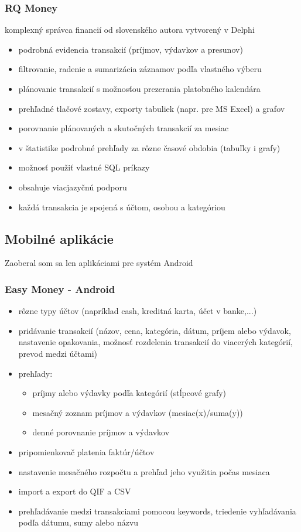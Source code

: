 \documentclass[12pt,onesided]{book}
\begin{document}
\subsubsection{RQ Money \cite{RQMoney}\ }
komplexný správca financií od slovenského autora vytvorený v Delphi
\begin{itemize}
\item{podrobná evidencia transakcií (príjmov, výdavkov a presunov)}
\item{filtrovanie, radenie a sumarizácia záznamov podľa vlastného výberu}
\item{plánovanie transakcií s možnosťou prezerania platobného kalendára}
\item{prehľadné tlačové zostavy, exporty tabuliek (napr. pre MS Excel) a grafov}
\item{porovnanie plánovaných a skutočných transakcií za mesiac}
\item{v štatistike podrobné prehľady za rôzne časové obdobia (tabuľky i grafy)}
\item{možnosť použiť vlastné SQL príkazy}
\item{obsahuje viacjazyčnú podporu}
\item{každá transakcia je spojená s účtom, osobou a kategóriou}
\end{itemize}

\subsection{Mobilné aplikácie}
Zaoberal som sa len aplikáciami pre systém Android
\subsubsection{Easy Money - Android \cite{EasyMoney}\ }
\begin{itemize}
\item{rôzne typy účtov (napríklad cash, kreditná karta, účet v banke,...)}
\item{pridávanie transakcií (názov, cena, kategória, dátum, príjem alebo výdavok, nastavenie opakovania, možnosť rozdelenia transakcií do viacerých kategórií, prevod medzi účtami)}
\item{prehľady:}
\begin{itemize}
\item{príjmy alebo výdavky podľa kategórií (stĺpcové grafy)}
\item{mesačný zoznam príjmov a výdavkov (mesiac(x)/suma(y))}
\item{denné porovnanie príjmov a výdavkov}
\end{itemize} 
\item{pripomienkovač platenia faktúr/účtov}
\item{nastavenie mesačného rozpočtu a prehľad jeho využitia počas mesiaca}
\item{import a export do QIF a CSV}
\item{prehľadávanie medzi transakciami pomocou keywords, triedenie vyhľadávania podľa dátumu, sumy alebo názvu}
\end{itemize}
\end{document}
